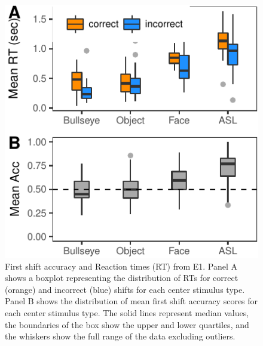 \documentclass[10pt, letterpaper]{article}
\newenvironment{CodeChunk}{}{}
\begin{document}
\begin{CodeChunk}
\begin{figure}[t]

{\centering \includegraphics{figs/e1_acc_rt_plot-1} 

}

\caption[First shift accuracy and Reaction times (RT) from E1]{First shift accuracy and Reaction times (RT) from E1. Panel A shows a boxplot representing the distribution of RTs for correct (orange) and incorrect (blue) shifts for each center stimulus type. Panel B shows the distribution of mean first shift accuracy scores for each center stimulus type. The solid lines represent median values, the boundaries of the box show the upper and lower quartiles, and the whiskers show the full range of the data excluding outliers.}\label{fig:e1_acc_rt_plot}
\end{figure}
\end{CodeChunk}
\end{document}
